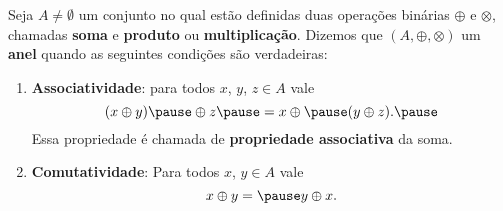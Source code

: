 \documentclass{beamer}
\begin{document}
    \begin{frame}
        \begin{definicao}
            Seja $A \ne \emptyset$ um conjunto \pause no qual est\~ao definidas duas opera{\c c}{\~o}es bin\'arias
            \pause $\oplus$ \pause e $\otimes$, \pause chamadas \textbf{soma} \pause e \textbf{produto} \pause ou
            \textbf{multiplicação}. \pause Dizemos que $(A, \oplus, \otimes)$  um \textbf{anel} \pause
            quando as seguintes condi{\c c}{\~o}es s{\~a}o verdadeiras:\pause
            \begin{enumerate}[label={\roman*})]
                \item \textbf{Associatividade}: \pause para todos $x$, \pause $y$, \pause $z \in A$ \pause vale\pause
                \[
                    (x \oplus y) \pause \oplus z \pause = x \oplus \pause (y \oplus z).\pause
                \]
                Essa propriedade {\'e} chamada de \pause \textbf{propriedade associativa} \pause da soma.\pause

                \vspace{.7cm}

                \item \textbf{Comutatividade}: \pause Para todos $x$, \pause $y \in A$ \pause vale\pause
                \[
                    x \oplus y = \pause y \oplus x.
                \]

                \vspace{.7cm}

                \seti
            \end{enumerate}
        \end{definicao}
    \end{frame}
\end{document}

